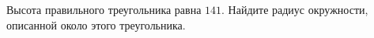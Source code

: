 \begin{ex}
	\begin{condition}
		Высота правильного треугольника равна \( 141 \). Найдите радиус окружности, описанной около этого треугольника.
	\end{condition}
\end{ex}